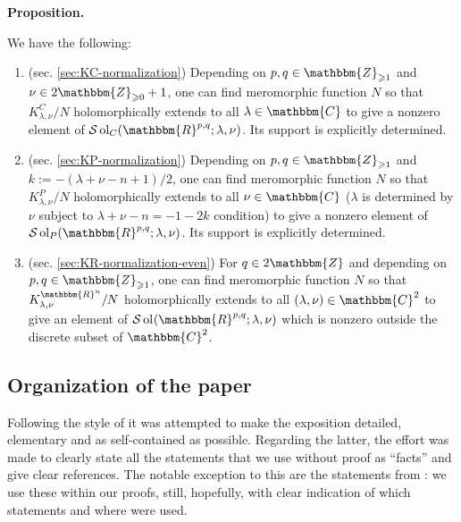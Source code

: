 \documentclass{article}
\newcommand{\assign}{:=}
\newcommand{\tmop}[1]{\ensuremath{\operatorname{#1}}}
\newcommand{\tmtextbf}[1]{{\bfseries{#1}}}
\newcommand{\tmtextit}[1]{{\itshape{#1}}}
\numberwithin{definition}{section}
\numberwithin{lemma}{section}
\numberwithin{proposition}{section}
{\theorembodyfont{\rmfamily}\newtheorem{remark}{Remark}
\numberwithin{remark}{section}
}
\begin{document}
{\noindent}\tmtextbf{Proposition. }\tmtextit{We have the following:
\begin{enumerate}
  \item (sec. \ref{sec:KC-normalization}) Depending on $p, q \in
  \mathbbm{Z}_{\geqslant 1}$ and $\nu \in 2\mathbbm{Z}_{\geqslant 0} + 1$, one
  can find meromorphic function $N$ so that $K_{\lambda, \nu}^C / N$
  holomorphically extends to all $\lambda \in \mathbbm{C}$ to give a nonzero
  element of $\mathcal{S} \tmop{ol}_C ( \mathbbm{R}^{p, q} ; \lambda, \nu)$.
  Its support is explicitly determined.
  
  \item (sec. \ref{sec:KP-normalization}) Depending on $p, q \in
  \mathbbm{Z}_{\geqslant 1}$ and $k \assign - ( \lambda + \nu - n + 1) / 2$,
  one can find meromorphic function $N$ so that $K_{\lambda, \nu}^P / N$
  holomorphically extends to all $\nu \in \mathbbm{C}$ ($\lambda$ is
  determined by $\nu$ subject to $\lambda + \nu - n = - 1 - 2 k$ condition) to
  give a nonzero element of $\mathcal{S} \tmop{ol}_P ( \mathbbm{R}^{p, q} ;
  \lambda, \nu)$. Its support is explicitly determined.
  
  \item (sec. \ref{sec:KR-normalization-even}) For $q \in 2\mathbbm{Z}$ and
  depending on $p, q \in \mathbbm{Z}_{\geqslant 1}$, one can find meromorphic
  function $N$ so that $K_{\lambda, \nu}^{\mathbbm{R}^n} / N$ holomorphically
  extends to all $ ( \lambda, \nu) \in \mathbbm{C}^2$ to give an element of
  $\mathcal{S} \tmop{ol}_{} ( \mathbbm{R}^{p, q} ; \lambda, \nu)$ which is
  nonzero outside the discrete subset of $\mathbbm{C}^2$.
\end{enumerate}}{\hspace*{\fill}}{\medskip}

\subsection{Organization of the paper}

Following the style of {\cite{kobayashi2015symmetry}} it was attempted to make
the exposition detailed, elementary and as self-contained as possible.
Regarding the latter, the effort was made to clearly state all the statements
that we use without proof as ``facts'' and give clear references. The notable
exception to this are the statements from {\cite{kobayashi2015symmetry}}: we
use these within our proofs, still, hopefully, with clear indication of which
statements and where were used.
\end{document}
